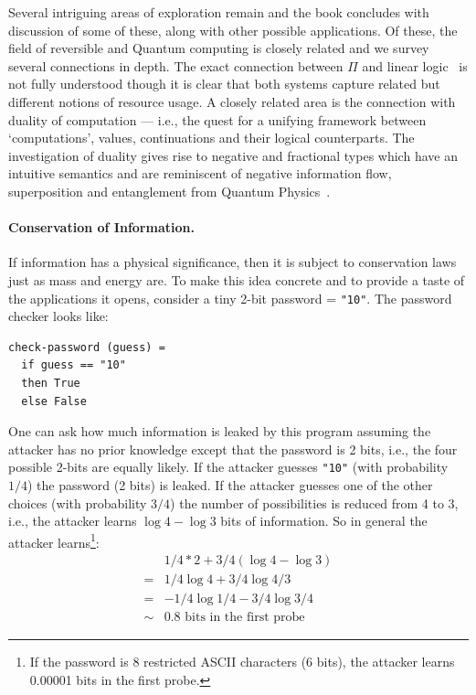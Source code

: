 \documentclass{article}
\begin{document}
Several intriguing areas of exploration remain and the book concludes
with discussion of some of these, along with other possible
applications.  Of these, the field of reversible and Quantum computing
is closely related and we survey several connections in depth.  The
exact connection between $\Pi$ and linear logic~\cite{Girard87tcs} is
not fully understood though it is clear that both systems capture
related but different notions of resource usage. A closely related
area is the connection with duality of computation \cite{Filinski:89,
  DBLP:conf/icfp/CurienH00, 10.1109/LICS.2010.23,Wadler:2003} ---
i.e., the quest for a unifying framework between `computations',
values, continuations and their logical counterparts. The
investigation of duality gives rise to negative and fractional types
which have an intuitive semantics and are reminiscent of negative
information flow, superposition and entanglement from Quantum
Physics~\cite{piee}.

\paragraph*{Conservation of Information.}

If information has a physical significance, then it is subject to
conservation laws just as mass and energy are.  To make this idea
concrete and to provide a taste of the applications it opens, consider
a tiny 2-bit password = \verb|"10"|. The password checker looks like:

\begin{verbatim}
check-password (guess) =
  if guess == "10"
  then True
  else False
\end{verbatim}

One can ask how much information is leaked by this program assuming
the attacker has no prior knowledge except that the password is 2
bits, i.e., the four possible 2-bits are equally likely. If the
attacker guesses \verb|"10"| (with probability $1/4$) the password (2
bits) is leaked. If the attacker guesses one of the other choices
(with probability $3/4$) the number of possibilities is reduced from 4
to 3, i.e., the attacker learns $\log{4} - \log{3}$ bits of
information. So in general the attacker learns\footnote{If the
  password is 8 restricted ASCII characters (6 bits), the attacker
  learns 0.00001 bits in the first probe.}:
\[\begin{array}{ll}
   &  1/4 * 2 + 3/4 (\log{4} - \log{3}) \\
  =&  1/4 \log{4} + 3/4 \log{4/3} \\
  =&  - 1/4 \log{1/4} - 3/4 \log{3/4} \\
  \sim& 0.8 \mbox{~bits~in~the~first~probe}
\end{array}\]
\end{document}
